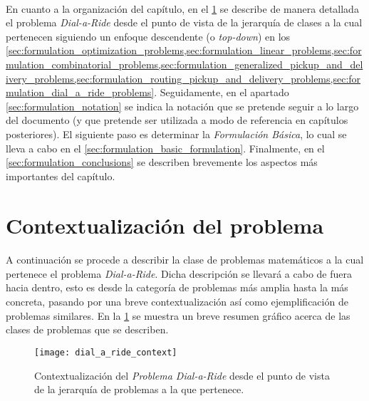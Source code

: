 \documentclass{subfiles}
\begin{document}
      \paragraph{}
      En cuanto a la organización del capítulo, en el \cref{sec:formulation_contextualization} se describe de manera detallada el problema \emph{Dial-a-Ride} desde el punto de vista de la jerarquía de clases a la cual pertenecen siguiendo un enfoque descendente (o \emph{top-down}) en los \cref{sec:formulation_optimization_problems,sec:formulation_linear_problems,sec:formulation_combinatorial_problems,sec:formulation_generalized_pickup_and_delivery_problems,sec:formulation_routing_pickup_and_delivery_problems,sec:formulation_dial_a_ride_problems}. Seguidamente, en el apartado \cref{sec:formulation_notation} se indica la notación que se pretende seguir a lo largo del documento (y que pretende ser utilizada a modo de referencia en capítulos posteriores). El siguiente paso es determinar la \emph{Formulación Básica}, lo cual se lleva a cabo en el \cref{sec:formulation_basic_formulation}. Finalmente, en el \cref{sec:formulation_conclusions} se describen brevemente los aspectos más importantes del capítulo.

    \section{Contextualización del problema}
    \label{sec:formulation_contextualization}

      \paragraph{}
      A continuación se procede a describir la clase de problemas matemáticos a la cual pertenece el problema \emph{Dial-a-Ride}. Dicha descripción se llevará a cabo de fuera hacia dentro, esto es desde la categoría de problemas más amplia hasta la más concreta, pasando por una breve contextualización así como ejemplificación de problemas similares. En la \cref{img:formulation_dial_a_ride_contextualization} se muestra un breve resumen gráfico acerca de las clases de problemas que se describen.

      \begin{figure}[ht]
        \centering
        \texttt{[image: dial\_a\_ride\_context]}
        \caption{Contextualización del \emph{Problema Dial-a-Ride} desde el punto de vista de la jerarquía de problemas a la que pertenece.}
        \label{img:formulation_dial_a_ride_contextualization}
      \end{figure}
\end{document}
